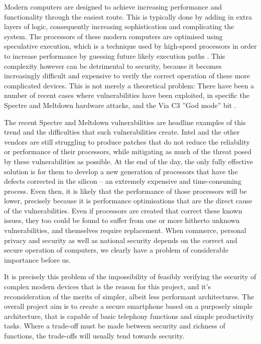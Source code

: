         Modern computers are designed to achieve increasing performance and functionality through the easiest route.
        This is typically done by adding in extra layers of logic, consequently increasing sophistication and complicating the system.
        The processors of these modern computers are optimised using speculative execution, which is a technique used by high-speed processors in order to increase performance by guessing future likely execution paths \cite{RN16}.
        This complexity however can be detrimental to security, because it becomes increasingly difficult and expensive to verify the correct operation of these more complicated devices.
        This is not merely a theoretical problem: There have been a number of recent cases where vulnerabilities have been exploited, in specific the Spectre and Meltdown hardware attacks, and the Via C3 ''God mode'' bit \cite{ViaC3x865:online}.

        The recent Spectre \cite{RN16} and Meltdown \cite{RN3} vulnerabilities are headline examples of this trend and the difficulties that such vulnerabilities create.
        Intel and the other vendors are still struggling to produce patches that do not reduce the reliability or performance of their processors, while mitigating as much of the threat posed by these vulnerabilities as possible.
        At the end of the day, the only fully effective solution is for them to develop a new generation of processors that have the defects corrected in the silicon – an extremely expensive and time-consuming process.
        Even then, it is likely that the performance of those processors will be lower, precisely because it is performance optimisations that are the direct cause of the vulnerabilities.
        Even if processors are created that correct these known issues, they too could be found to suffer from one or more hitherto unknown vulnerabilities, and themselves require replacement.
        When commerce, personal privacy and security as well as national security depends on the correct and secure operation of computers, we clearly have a problem of considerable importance before us.

        It is precisely this problem of the impossibility of feasibly verifying the security of complex modern devices that is the reason for this project, and it's reconsideration of the merits of simpler, albeit less performant architectures.
The overall project aim is to create a secure smartphone based on a purposely simple architecture, that is capable of basic telephony functions and simple productivity tasks.
Where a trade-off must be made between security and richness of functions, the trade-offs will usually tend towards security.


